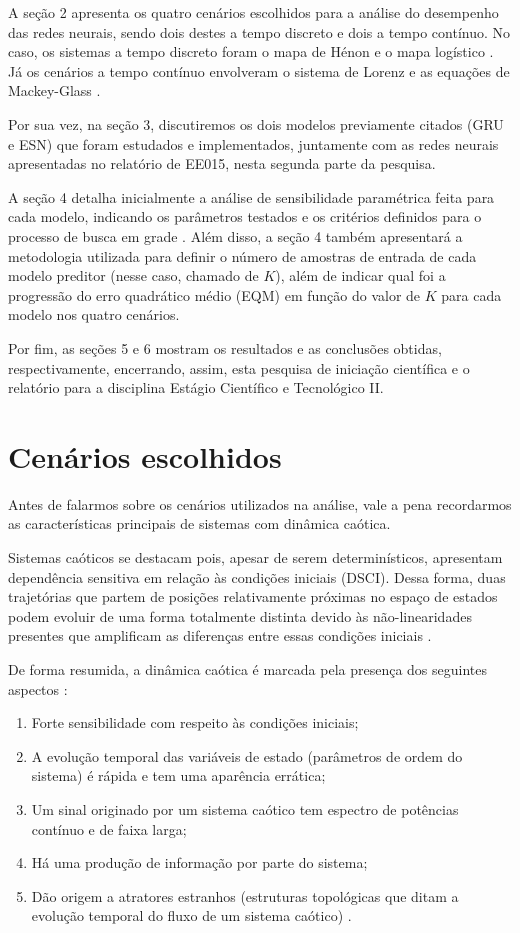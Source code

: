 \documentclass[a4paper, 12pt]{article}
\begin{document}
A seção 2 apresenta os quatro cenários escolhidos para a análise do desempenho das redes neurais, sendo dois destes a tempo discreto e dois a tempo contínuo. No caso, os sistemas a tempo discreto foram o mapa de Hénon \cite{henon1976two} e o mapa logístico \cite{may1976simple}. Já os cenários a tempo contínuo envolveram o sistema de Lorenz \cite{lorenz1963deterministic} e as equações de Mackey-Glass \cite{mackey1977oscillation}.

Por sua vez, na seção 3, discutiremos os dois modelos previamente citados (GRU e ESN) que foram estudados e implementados, juntamente com as redes neurais apresentadas no relatório de EE015, nesta segunda parte da pesquisa. 

A seção 4 detalha inicialmente a análise de sensibilidade paramétrica feita para cada modelo, indicando os parâmetros testados e os critérios definidos para o processo de busca em grade \cite{geron2019hands}. Além disso, a seção 4 também apresentará a metodologia utilizada para definir o número de amostras de entrada de cada modelo preditor (nesse caso, chamado de $K$), além de indicar qual foi a progressão do erro quadrático médio (EQM) em função do valor de $K$ para cada modelo nos quatro cenários.

Por fim, as seções 5 e 6 mostram os resultados e as conclusões obtidas, respectivamente, encerrando, assim, esta pesquisa de iniciação científica e o relatório para a disciplina Estágio Científico e Tecnológico II.
 
\section{Cenários escolhidos}

Antes de falarmos sobre os cenários utilizados na análise, vale a pena recordarmos as características principais de sistemas com dinâmica caótica. 

Sistemas caóticos se destacam pois, apesar de serem determinísticos, apresentam dependência sensitiva em relação às condições iniciais (DSCI). Dessa forma, duas trajetórias que partem de posições relativamente próximas no espaço de estados podem evoluir de uma forma totalmente distinta devido às não-linearidades presentes que amplificam as diferenças entre essas condições iniciais \cite{fiedler1994caos}.

De forma resumida, a dinâmica caótica é marcada pela presença dos seguintes aspectos \cite{attux2001dinamica}:
\begin{enumerate}
\item Forte sensibilidade com respeito às condições iniciais;
\item A evolução temporal das variáveis de estado (parâmetros de ordem do sistema) é rápida e tem uma aparência errática;
\item Um sinal originado por um sistema caótico tem espectro de potências contínuo e de faixa larga;
\item Há uma produção de informação por parte do sistema;
\item Dão origem a atratores estranhos (estruturas topológicas que ditam a evolução temporal do fluxo de um sistema caótico) \cite{ruelle1971nature}.
\end{enumerate}
\end{document}
